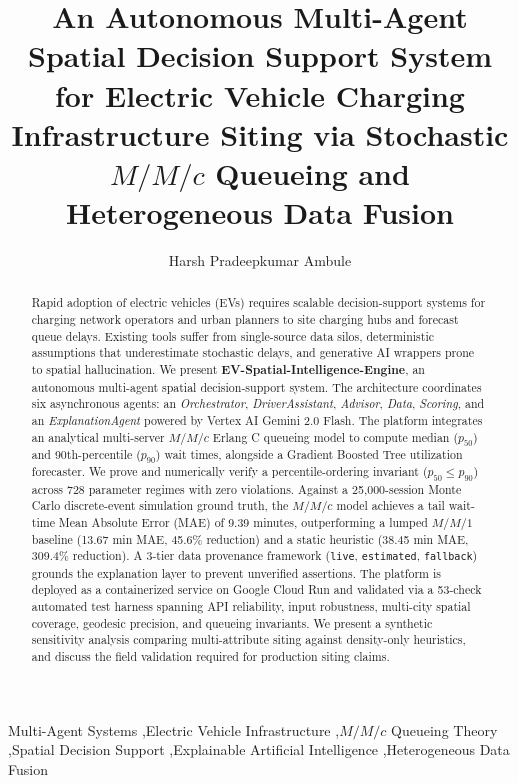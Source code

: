 \documentclass[preprint,12pt,authoryear]{elsarticle}
\begin{document}
\begin{frontmatter}

\title{An Autonomous Multi-Agent Spatial Decision Support System for Electric Vehicle Charging Infrastructure Siting via Stochastic $M/M/c$ Queueing and Heterogeneous Data Fusion}


\author[inst1]{Harsh Pradeepkumar Ambule}



\begin{abstract}
Rapid adoption of electric vehicles (EVs) requires scalable decision-support systems for charging network operators and urban planners to site charging hubs and forecast queue delays. Existing tools suffer from single-source data silos, deterministic assumptions that underestimate stochastic delays, and generative AI wrappers prone to spatial hallucination. We present \textbf{EV-Spatial-Intelligence-Engine}, an autonomous multi-agent spatial decision-support system. The architecture coordinates six asynchronous agents: an \textit{Orchestrator}, \textit{DriverAssistant}, \textit{Advisor}, \textit{Data}, \textit{Scoring}, and an \textit{ExplanationAgent} powered by Vertex AI Gemini 2.0 Flash. The platform integrates an analytical multi-server $M/M/c$ Erlang C queueing model to compute median ($p_{50}$) and 90th-percentile ($p_{90}$) wait times, alongside a Gradient Boosted Tree utilization forecaster. We prove and numerically verify a percentile-ordering invariant ($p_{50} \le p_{90}$) across 728 parameter regimes with zero violations. Against a 25{,}000-session Monte Carlo discrete-event simulation ground truth, the $M/M/c$ model achieves a tail wait-time Mean Absolute Error (MAE) of 9.39 minutes, outperforming a lumped $M/M/1$ baseline (13.67 min MAE, 45.6\% reduction) and a static heuristic (38.45 min MAE, 309.4\% reduction). A 3-tier data provenance framework (\texttt{live}, \texttt{estimated}, \texttt{fallback}) grounds the explanation layer to prevent unverified assertions. The platform is deployed as a containerized service on Google Cloud Run and validated via a 53-check automated test harness spanning API reliability, input robustness, multi-city spatial coverage, geodesic precision, and queueing invariants. We present a synthetic sensitivity analysis comparing multi-attribute siting against density-only heuristics, and discuss the field validation required for production siting claims.
\end{abstract}

\begin{keyword}
Multi-Agent Systems \sep Electric Vehicle Infrastructure \sep $M/M/c$ Queueing Theory \sep Spatial Decision Support \sep Explainable Artificial Intelligence \sep Heterogeneous Data Fusion
\end{keyword}

\end{frontmatter}
\end{document}
